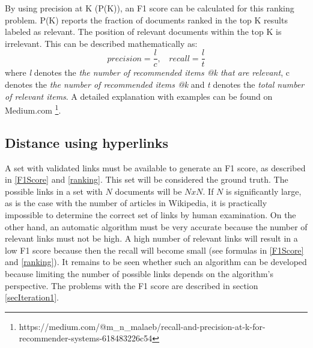 By using precision at K (P(K)), \cite{Agichtein2006} an F1 score can be calculated for this ranking problem. P(K) reports the fraction of documents ranked in the top K results labeled as relevant. The position of relevant documents within the top K is irrelevant. This can be described mathematically as:
$$precision = \frac{l}{c},\ \ \ \ recall = \frac{l}{t}$$ where \textit{l} denotes the \textit{the number of recommended items @k that are relevant}, {c} denotes the \textit{the number of recommended items @k} and \textit{t} denotes the \textit{total number of relevant items}. A detailed explanation with examples can be found on Medium.com \footnote{https://medium.com/@m\_n\_malaeb/recall-and-precision-at-k-for-recommender-systems-618483226c54}.\\
\subsection{Distance using hyperlinks}
\label{secHyperlinkDistance}
A set with validated links must be available to generate an F1 score, as described in \ref{F1Score} and \ref{ranking}. This set will be considered the ground truth. The possible links in a set with $N$ documents will be $N x N$. If $N$ is significantly large, as is the case with the number of articles in Wikipedia, it is practically impossible to determine the correct set of links by human examination. On the other hand, an automatic algorithm must be very accurate because the number of relevant links must not be high. A high number of relevant links will result in a low F1 score because then the recall will become small (see formulas in  \ref{F1Score} and \ref{ranking}). It remains to be seen whether such an algorithm can be developed because limiting the number of possible links depends on the algorithm's perspective. The problems with the F1 score are described in section \ref{secIteration1}. 
 \\

